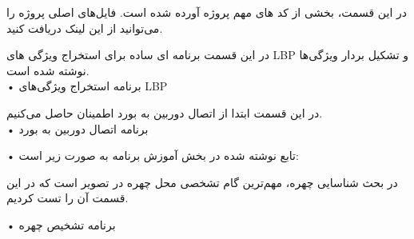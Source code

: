 



در این قسمت، بخشی از کد های مهم پروژه آورده شده است. فایل‌های اصلی پروژه را می‌توانید از این لینک دریافت کنید.

در این قسمت برنامه ای ساده برای استخراج ویژگی های LBP و تشکیل بردار ویژگی‌ها نوشته شده است. \\
• برنامه استخراج ویژگی‌های LBP
\begin{latin}
	
\end{latin}

در این قسمت ابتدا از اتصال دوربین به بورد اطمینان حاصل می‌کنیم. \\
• برنامه اتصال دوربین به بورد
\begin{latin}
	
\end{latin}

• تابع نوشته شده در بخش آموزش برنامه به صورت زیر است:
\begin{latin}
	
\end{latin}


در بحث شناسایی چهره، مهم‌ترین گام تشخصی محل چهره در تصویر است که در این قسمت آن را تست کردیم.

• برنامه تشخیص چهره
\begin{latin}
	
\end{latin}
